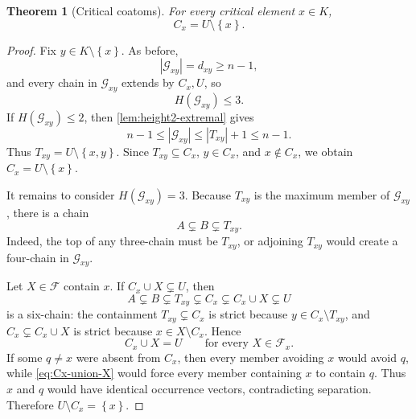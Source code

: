 \documentclass[10pt,a4paper]{amsart}
\newtheorem{theorem}{Theorem}
\newcommand{\F}{\mathcal{F}}
\newcommand{\G}{\mathcal{G}}
\newcommand{\abs}[1]{\left|#1\right|}
\newcommand{\set}[1]{\left\{#1\right\}}
\begin{document}
\begin{theorem}[Critical coatoms]\label{thm:critical-coatom}
For every critical element \(x\in K\),
\begin{equation}\label{eq:critical-coatom}
\boxed{C_x=U\setminus\set{x}.}
\end{equation}
\end{theorem}

\begin{proof}
Fix \(y\in K\setminus\set{x}\).  As before,
\[
\abs{\G_{xy}}=d_{xy}\ge n-1,
\]
and every chain in \(\G_{xy}\) extends by \(C_x,U\), so
\begin{equation}\label{eq:Gxy-height3}
H(\G_{xy})\le3.
\end{equation}
If \(H(\G_{xy})\le2\), then \cref{lem:height2-extremal} gives
\[
n-1\le \abs{\G_{xy}}
\le \abs{T_{xy}}+1
\le n-1.
\]
Thus \(T_{xy}=U\setminus\set{x,y}\).  Since \(T_{xy}\subseteq C_x\), \(y\in C_x\), and \(x\notin C_x\), we obtain \(C_x=U\setminus\set{x}\).

It remains to consider \(H(\G_{xy})=3\).  Because \(T_{xy}\) is the maximum member of \(\G_{xy}\), there is a chain
\begin{equation}\label{eq:ABT}
A\subsetneq B\subsetneq T_{xy}.
\end{equation}
Indeed, the top of any three-chain must be \(T_{xy}\), or adjoining \(T_{xy}\) would create a four-chain in \(\G_{xy}\).

Let \(X\in\F\) contain \(x\).  If \(C_x\cup X\subsetneq U\), then
\[
A\subsetneq B\subsetneq T_{xy}
\subsetneq C_x
\subsetneq C_x\cup X
\subsetneq U
\]
is a six-chain: the containment \(T_{xy}\subsetneq C_x\) is strict because \(y\in C_x\setminus T_{xy}\), and \(C_x\subsetneq C_x\cup X\) is strict because \(x\in X\setminus C_x\).  Hence
\begin{equation}\label{eq:Cx-union-X}
C_x\cup X=U
\qquad\text{for every }X\in\F_x.
\end{equation}
If some \(q\ne x\) were absent from \(C_x\), then every member avoiding \(x\) would avoid \(q\), while \cref{eq:Cx-union-X} would force every member containing \(x\) to contain \(q\).  Thus \(x\) and \(q\) would have identical occurrence vectors, contradicting separation.  Therefore \(U\setminus C_x=\set{x}\).
\end{proof}
\end{document}
